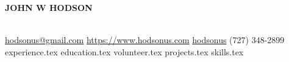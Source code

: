 \documentclass[11pt]{article}
\newcommand*{\sectiondir}{sections/}
\begin{document}
	\noindent\centerline{ \huge\textbf{JOHN W HODSON}}\\

	\noindent
	\faEnvelopeSquare \space\href{mailto:hodsonus@gmail.com}{hodsonus@gmail.com} \hspace*{\fill}
	\faHome \space \href{https://www.hodsonus.com}{https://www.hodsonus.com} \hspace*{\fill}
	\faGithub \space \href{https://github.com/hodsonus}{hodsonus} \hspace*{\fill}
	\faMobilePhone \space (727) 348-2899\\

	{experience.tex}
	{education.tex}
	{volunteer.tex}
	{projects.tex}
	{skills.tex}
		
\end{document}
